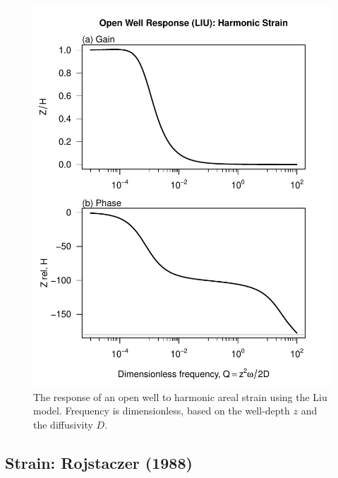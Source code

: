 \documentclass[12pt]{article}\usepackage[]{graphicx}\usepackage[]{color}
\makeatletter
\def\maxwidth{ %
  \ifdim\Gin@nat@width>\linewidth
    \linewidth
  \else
    \Gin@nat@width
  \fi
}
\newenvironment{knitrout}{}{} %
\makeatother
\begin{document}
\begin{figure}[htb!]
\begin{center}
\begin{knitrout}\small
{}\color{fgcolor}
\includegraphics[width=\maxwidth]{figure/LIURESPFIG-1} 

\end{knitrout}
\caption{The response of an open well to harmonic areal strain using
the Liu model. 
Frequency is dimensionless, based on the well-depth $z$ and the diffusivity $D$.
}
\label{fig:owrsp-liu}
\end{center}
\end{figure}

\clearpage
\subsection{Strain: Rojstaczer (1988)}
\end{document}
